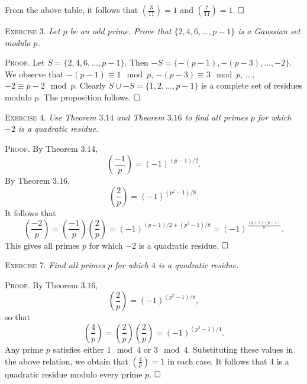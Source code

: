 \documentclass[11pt, leqno]{article}
\newcommand{\done}{\ensuremath{\hfill\square}}
\begin{document}
From the above table, it follows that $\left(\frac{3}{11}\right) = 1$ and $\left(\frac{7}{11}\right) = 1$. \done

\textsc{Exercise 3}. \emph{Let $p$ be an odd prime. Prove that $\{2, 4, 6, \ldots, p-1\}$ is a Gaussian set modulo $p$.}

\textsc{Proof}. Let $S=\{2, 4, 6, \ldots, p-1\} $. Then $-S = \{-(p-1), -(p-3), \ldots, -2\}$. We observe that $-(p-1) \equiv 1 \mod p$, $-(p-3) \equiv 3 \mod p$, $\ldots$, $-2 \equiv p-2 \mod p$. Clearly $S\cup -S = \{1, 2, \ldots, p-1\}$ is a complete set of residues modulo $p$. The proposition follows. \done

\textsc{Exercise 4}. \emph{Use Theorem $3.14$ and Theorem $3.16$ to find all primes $p$ for which $-2$ is a quadratic residue.}

\textsc{Proof}. By Theorem $3.14$, 
\begin{displaymath}
\left( \frac{-1}{p} \right) = (-1)^{(p-1)/2}.
\end{displaymath}
By Theorem $3.16$, 
\begin{displaymath}
\left( \frac{2}{p} \right) = (-1)^{(p^2-1)/8}.
\end{displaymath}
It follows that 
\begin{displaymath}
\left( \frac{-2}{p} \right) = \left( \frac{-1}{p} \right) \left( \frac{2}{p} \right) = (-1)^{(p-1)/2 + (p^2-1)/8} = (-1)^{\frac{(p+5)(p-1)}{8}}.
\end{displaymath}
This gives all primes $p$ for which $-2$ is a quadratic residue. \done


\textsc{Exercise 7}. \emph{Find all primes $p$ for which $4$ is a quadratic residue.}

\textsc{Proof}. By Theorem $3.16$, 
\begin{displaymath}
\left( \frac{2}{p} \right) = (-1)^{(p^2-1)/8},
\end{displaymath}
so that 
\begin{displaymath}
\left( \frac{4}{p} \right) = \left( \frac{2}{p} \right) \left( \frac{2}{p} \right) = (-1)^{(p^2-1)/4}.
\end{displaymath}
Any prime $p$ satisfies either $1 \mod 4$ or $3 \mod 4$. Substituting these values in the above relation, we obtain that $\left( \frac{4}{p} \right) = 1$ in each case. It follows that $4$ is a quadratic residue modulo every prime $p$. \done
\end{document}
